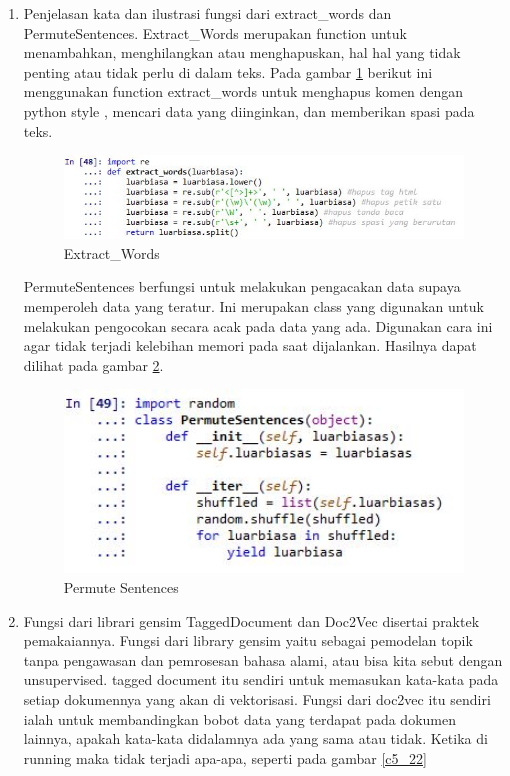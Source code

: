\begin{enumerate}
\item Penjelasan kata dan ilustrasi fungsi dari extract\_words dan PermuteSentences.
\subitem Extract\_Words merupakan function untuk menambahkan, menghilangkan atau menghapuskan, hal hal yang tidak penting atau tidak perlu di dalam teks. Pada gambar \ref{c5_20} berikut ini menggunakan function extract\_words untuk menghapus komen dengan python style , mencari data yang diinginkan, dan memberikan spasi pada teks.
\begin{figure}[!htbp]
\centerline{\includegraphics[width=1\textwidth]{figures/c5p/20.JPG}}
\caption{Extract\_Words}
\label{c5_20}
\end{figure}
\subitem PermuteSentences berfungsi untuk melakukan pengacakan data supaya memperoleh data yang teratur. Ini merupakan class yang digunakan untuk melakukan pengocokan secara acak pada data yang ada. Digunakan cara ini agar tidak terjadi kelebihan memori pada saat dijalankan. Hasilnya dapat dilihat pada gambar \ref{c5_21}.
\begin{figure}[!htbp]
\centerline{\includegraphics[width=1\textwidth]{figures/c5p/21.JPG}}
\caption{Permute Sentences}
\label{c5_21}
\end{figure}
\item Fungsi dari librari gensim TaggedDocument dan Doc2Vec disertai praktek pemakaiannya.
\subitem Fungsi dari library gensim yaitu sebagai pemodelan topik tanpa pengawasan dan pemrosesan bahasa alami, atau bisa kita sebut dengan unsupervised.  tagged document itu sendiri untuk memasukan kata-kata pada setiap dokumennya yang akan di vektorisasi. Fungsi dari doc2vec itu sendiri ialah untuk membandingkan bobot data yang terdapat pada dokumen lainnya, apakah kata-kata didalamnya ada yang sama atau tidak. Ketika di running maka tidak terjadi apa-apa, seperti pada gambar \ref{c5_22}

\end{enumerate}
